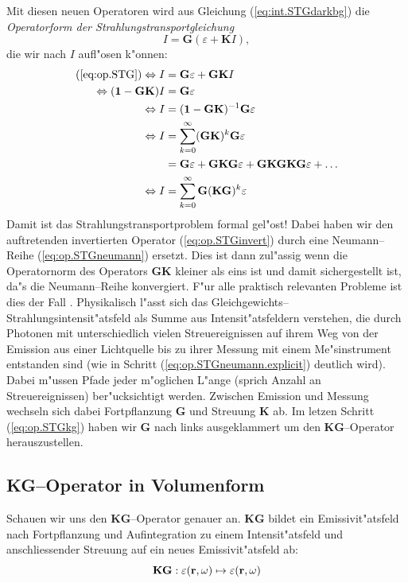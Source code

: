 	Mit diesen neuen Operatoren wird aus Gleichung (\ref{eq:int.STGdarkbg}) die {\em Operatorform der Strahlungstransportgleichung}
	\begin{equation}
		I=\mathbf{G}(\varepsilon + \mathbf{K}I),
		\label{eq:op.STG}
	\end{equation}
	die wir nach $I$ aufl"osen k"onnen:
	\begin{align}
		(\ref{eq:op.STG}) \Leftrightarrow I&=\mathbf{G}\varepsilon + \mathbf{GK}I \nonumber \\
		\Leftrightarrow (\mathbf{1}-\mathbf{GK})I &= \mathbf{G}\varepsilon \nonumber \\
		\Leftrightarrow I &= (\mathbf{1}-\mathbf{GK})^{-1}\mathbf{G}\varepsilon \label{eq:op.STGinvert} \\
		\Leftrightarrow I &= \sum_{k=0}^\infty (\mathbf{GK})^k \mathbf{G}\varepsilon \label{eq:op.STGneumann} \\
		&=\mathbf{G}\varepsilon + \mathbf{GKG}\varepsilon + \mathbf{GKGKG}\varepsilon + \hdots \label{eq:op.STGneumann.explicit} \\
		\Leftrightarrow I &=\sum_{k=0}^\infty \mathbf{G} (\mathbf{KG})^k \varepsilon \label{eq:op.STGkg}
	\end{align}
	Damit ist das Strahlungstransportproblem formal gel"ost! Dabei haben wir den auftretenden invertierten Operator (\ref{eq:op.STGinvert}) durch eine Neumann--Reihe (\ref{eq:op.STGneumann}) ersetzt. Dies ist dann zul"assig wenn die Operatornorm des Operators $\mathbf{GK}$ kleiner als eins ist und damit sichergestellt ist, da"s die Neumann--Reihe konvergiert. F"ur alle praktisch relevanten Probleme ist dies der Fall \citep[siehe][Theorem 12 und 13]{Arvo:1995p9257}. Physikalisch l"asst sich das Gleichgewichts--Strahlungsintensit"atsfeld als Summe aus Intensit"atsfeldern verstehen, die durch Photonen mit unterschiedlich vielen Streuereignissen auf ihrem Weg von der Emission aus einer Lichtquelle bis zu ihrer Messung mit einem Me"sinstrument entstanden sind (wie in Schritt (\ref{eq:op.STGneumann.explicit}) deutlich wird). Dabei m"ussen Pfade jeder m"oglichen L"ange (sprich Anzahl an Streuereignissen) ber"ucksichtigt werden. Zwischen Emission und Messung wechseln sich dabei Fortpflanzung $\mathbf{G}$ und Streuung $\mathbf{K}$ ab. Im letzen Schritt (\ref{eq:op.STGkg}) haben wir $\mathbf{G}$ nach links ausgeklammert um den $\mathbf{KG}$--Operator herauszustellen.
	
	
	\subsection{KG--Operator in Volumenform}
	Schauen wir uns den $\mathbf{KG}$--Operator genauer an. $\mathbf{KG}$ bildet ein Emissivit"atsfeld nach Fortpflanzung und Aufintegration zu einem Intensit"atsfeld und anschliessender Streuung auf ein neues Emissivit"atsfeld ab:
	\begin{equation*}
		\mathbf{KG} : \varepsilon(\mathbf{r},\omega) \mapsto \varepsilon(\mathbf{r},\omega)
	\end{equation*}

